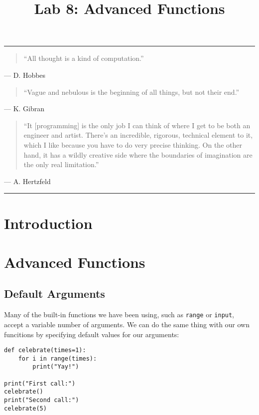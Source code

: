\documentclass[11pt]{cselabheader}
\title{Lab 8: Advanced Functions}
\begin{document}
\maketitle

\hrule
\begin{quotation}
``All thought is a kind of computation.''
\end{quotation}
\begin{flushright}
--- D. Hobbes
\end{flushright}

\begin{quotation}
``Vague and nebulous is the beginning of all things, but not their end.''
\end{quotation}
\begin{flushright}
--- K. Gibran
\end{flushright}

\begin{quotation}
``It [programming] is the only job I can think of where I get to be both an
engineer and artist. There's an incredible, rigorous, technical element to it,
which I like because you have to do very precise thinking. On the other hand, it
has a wildly creative side where the boundaries of imagination are the only real
limitation.''
\end{quotation}
\begin{flushright}
--- A. Hertzfeld
\end{flushright}

\hrule

\section{Introduction}


\pagebreak
\section{Advanced Functions}
\label{sec:advfun}

\subsection{Default Arguments}
\label{subsec:arg}
Many of the built-in functions we have been using, such as \lstinline{range} or \lstinline{input}, accept a variable number of arguments. We can do the same thing with our own funcitions by specifying default values for our arguments:

\begin{lstlisting}[style=python]
def celebrate(times=1):
    for i in range(times):
        print("Yay!")

print("First call:")
celebrate()
print("Second call:")
celebrate(5)
\end{lstlisting}
\end{document}
